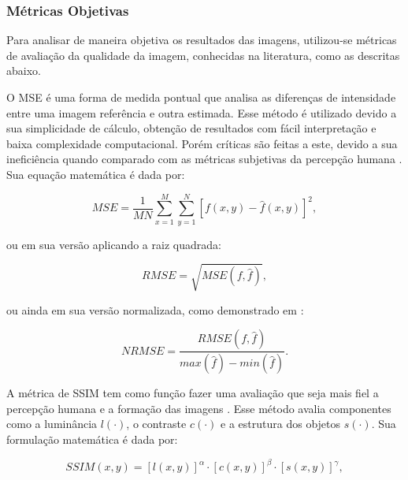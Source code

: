 \subsubsection{Métricas Objetivas} 

Para analisar de maneira objetiva os resultados das imagens, utilizou-se métricas de avaliação da qualidade da imagem, conhecidas na literatura, como as descritas abaixo.

O  \acs{MSE} é uma forma de medida pontual que analisa as diferenças de intensidade entre uma imagem referência e outra estimada. Esse método é utilizado devido a sua simplicidade de cálculo, obtenção de resultados com fácil interpretação e baixa complexidade computacional. Porém críticas são feitas a este, devido a sua ineficiência quando comparado com as métricas subjetivas da percepção humana \cite{gonzalez2008digital,wang2004image}. Sua equação matemática é dada por:

\begin{equation}
MSE = \dfrac{1}{MN} \sum_{x=1}^{M} \sum_{y=1}^{N} [f(x,y) - \hat{f}(x,y)]^{2},
\label{eq:eqCap4MSE}
\end{equation} 

\noindent ou em sua versão aplicando a raiz quadrada:

\begin{equation}
RMSE = \sqrt{MSE(f,\hat{f})},
\label{eq:eqCap4RMSE}
\end{equation}
 
\noindent ou ainda em sua versão normalizada, como demonstrado em :

\begin{equation}
NRMSE = \dfrac{RMSE(f,\hat{f})}{max(\hat{f}) - min(\hat{f})}.
\label{eq:eqCap4NRMSE}
\end{equation}

%


A métrica de \acs{SSIM} tem como função fazer uma avaliação que seja mais fiel a percepção humana e a formação das imagens \cite[]{wang2004image}. Esse método avalia componentes como a  luminância $l(\cdot)$, o contraste $c(\cdot)$ e a estrutura dos objetos $s(\cdot)$. Sua formulação matemática é dada por:

\begin{equation}
SSIM(x,y) = [l(x,y)]^{\alpha} \cdot [c(x,y)]^{\beta} \cdot [s(x,y)]^{\gamma},
\label{eq:eqCap4SSIM}
\end{equation}

